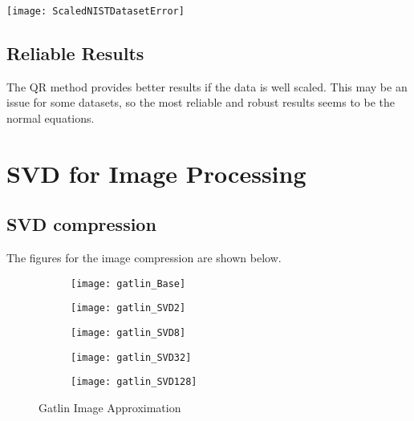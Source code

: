 \documentclass{article}
\begin{document}
\texttt{[image: ScaledNISTDatasetError]}

\subsection{Reliable Results}

The QR method provides better results if the data is well scaled. This may be an issue for some datasets, so the most reliable and robust results seems to be the normal equations. 


\section{SVD for Image Processing}

\subsection{SVD compression}

The figures for the image compression are shown below.


\begin{figure}[h!]

\begin{subfigure}{.5\textwidth}
  \centering
  \texttt{[image: gatlin\_Base]}
\end{subfigure}%
\begin{subfigure}{.5\textwidth}
  \centering
  \texttt{[image: gatlin\_SVD2]}
\end{subfigure}

\begin{subfigure}{.5\textwidth}
  \centering
  \texttt{[image: gatlin\_SVD8]}
\end{subfigure}
\begin{subfigure}{.5\textwidth}
  \centering
  \texttt{[image: gatlin\_SVD32]}
\end{subfigure}

\begin{subfigure}{.5\textwidth}
  \centering
  \texttt{[image: gatlin\_SVD128]}
\end{subfigure}
\caption{Gatlin Image Approximation}
\end{figure}
\end{document}
